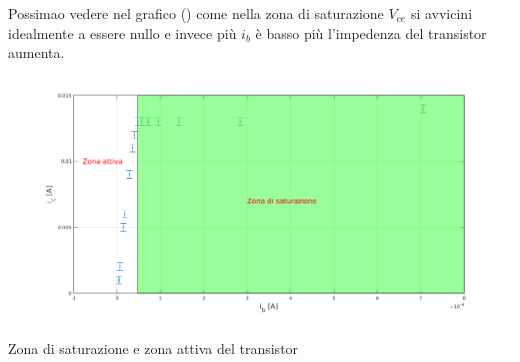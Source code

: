\documentclass[letterpaper,11pt]{article}
\begin{document}
\begin{body}
Possimao vedere nel grafico () come nella zona di saturazione $V_{ce}$ si avvicini idealmente a essere nullo e invece più $i_b$ è basso più l'impedenza del transistor aumenta.


\newpage
\begin{figurehere}
\centering
\includegraphics[width=1\textwidth]{sat.png}
\caption{Zona di saturazione e zona attiva del transistor}
\end{figurehere}
\end{body}
\end{document}
